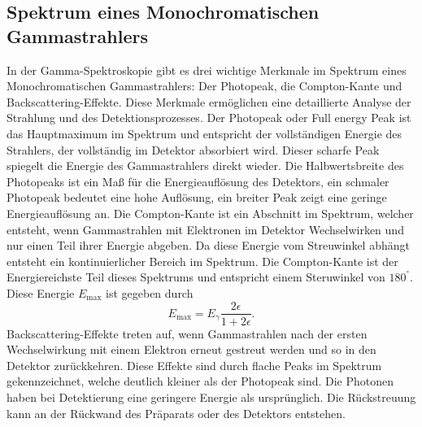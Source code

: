 \subsection{Spektrum eines Monochromatischen Gammastrahlers}
In der Gamma-Spektroskopie gibt es drei wichtige Merkmale im Spektrum eines Monochromatischen Gammastrahlers: Der Photopeak,
die Compton-Kante und Backscattering-Effekte. Diese Merkmale ermöglichen eine detaillierte Analyse der Strahlung und des Detektionsprozesses.
Der Photopeak oder Full energy Peak ist das Hauptmaximum im Spektrum und entspricht der vollständigen Energie
des Strahlers, der vollständig im Detektor absorbiert wird. Dieser scharfe Peak spiegelt die Energie des Gammastrahlers direkt wieder.
Die Halbwertsbreite des Photopeaks ist ein Maß für die Energieauflösung des Detektors, ein schmaler Photopeak bedeutet eine
hohe Auflösung, ein breiter Peak zeigt eine geringe Energieauflösung an.
Die Compton-Kante ist ein Abschnitt im Spektrum, welcher entsteht, wenn Gammastrahlen mit Elektronen im Detektor Wechselwirken und nur
einen Teil ihrer Energie abgeben. Da diese Energie vom Streuwinkel abhängt entsteht ein kontinuierlicher Bereich im 
Spektrum. Die Compton-Kante ist der Energiereichste Teil dieses Spektrums und entspricht einem Steruwinkel von $180^°$.
Diese Energie $E_{\text{max}}$ ist gegeben durch
\begin{equation}
    E_{\text{max}}=E_{\gamma}\frac{2\epsilon}{1+2\epsilon}.
    \label{eq:E_max}
\end{equation}    
Backscattering-Effekte treten auf, wenn Gammastrahlen nach der ersten Wechselwirkung mit einem Elektron erneut gestreut werden 
und so in den Detektor zurückkehren. Diese Effekte sind durch flache Peaks im Spektrum gekennzeichnet, welche deutlich kleiner als
der Photopeak sind. Die Photonen haben bei Detektierung eine geringere Energie als ursprünglich. Die Rückstreuung kann an der Rückwand
des Präparats oder des Detektors entstehen.

